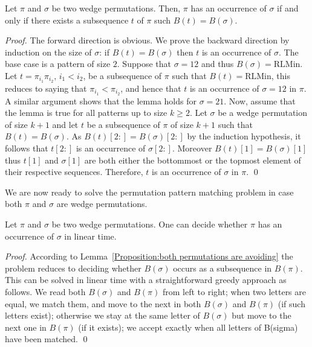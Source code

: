 \documentclass[a4paper]{llncs}
\newcommand{\RLMin}{\text{RLMin}}
\newcommand{\bijection}{B}
\begin{document}
\begin{lemma}
\label{lemma:MatchStripeToPermutation}
Let $\pi$ and $\sigma$ be two wedge permutations.
Then, $\pi$ has an occurrence of $\sigma$ if and only if
there exists a subsequence $t$ of $\pi$ such $\bijection(t)=\bijection(\sigma)$.
\end{lemma}

\begin{proof} %
The forward direction is obvious.
We prove the backward direction by induction on the size of
$\sigma$: if $\bijection(t)=\bijection(\sigma)$ then $t$ is an occurrence of $\sigma$.
The base case is a pattern of size $2$.
Suppose that $\sigma = 12$ and thus $\bijection(\sigma) = \RLMin$.
Let $t = \pi_{i_1}\pi_{i_2}$, $i_1 < i_2$, be a subsequence of $\pi$
such that $\bijection(t) = \RLMin$, this reduces to saying that
$\pi_{i_1} < \pi_{i_2}$,
and hence that $t$ is an occurrence of $\sigma = 12$ in $\pi$.
A similar argument shows that the lemma holds for $\sigma = 21$.
Now, assume that the lemma is true for all patterns up to size $k \geq 2$.
Let $\sigma$ be a wedge permutation of size $k+1$ and
let $t$
be a subsequence of $\pi$ of size $k+1$ such that
$\bijection(t) = \bijection(\sigma)$.
As $\bijection(t)[2:] = \bijection(\sigma)[2:]$
by the induction hypothesis, it follows that
$t[2:]$ is an occurrence of $\sigma[2:]$.
Moreover $\bijection(t)[1] = \bijection(\sigma)[1]$
thus $t[1]$ and $\sigma[1]$ are both either the bottommost or the topmost
element of their respective sequences.
Therefore, $t$ is an occurrence of $\sigma$ in $\pi$.
\qed
\end{proof}

We are now ready to solve the permutation pattern matching problem in case
both $\pi$ and $\sigma$ are wedge permutations.

\begin{proposition}
\label{Proposition:both permutations are avoiding}
Let $\pi$ and $\sigma$ be two wedge permutations.
One can decide whether $\pi$ has an occurrence of $\sigma$ in linear time.
\end{proposition}

\begin{proof}
According to Lemma~\ref{Proposition:both permutations are avoiding} the problem reduces
to deciding whether $\bijection(\sigma)$ occurs as a subsequence in $\bijection(\pi)$.
This can be solved in linear time with a straightforward greedy approach as follows.
We read both $\bijection(\sigma)$ and $\bijection(\pi)$ from left to right;
when two letters are equal, we match them, and move to the next in both
$\bijection(\sigma)$ and $\bijection(\pi)$ (if such letters exist);
otherwise we stay at the same letter of $\bijection(\sigma)$
but move to the next one in $\bijection(\pi)$ (if it exists);
we accept exactly when all letters of B(sigma) have been matched.
\qed
\end{proof}
\end{document}
